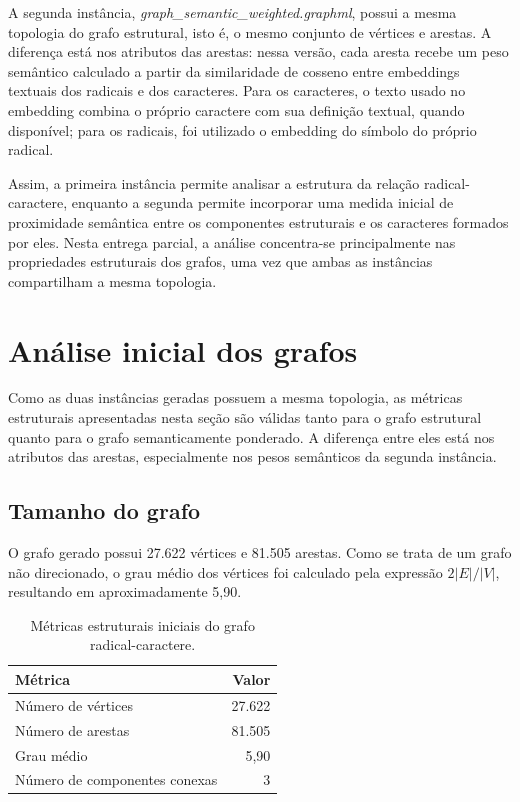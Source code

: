 \documentclass[10pt, a4paper]{extarticle}
\begin{document}
A segunda instância, \textit{graph\_semantic\_weighted.graphml}, possui a mesma topologia do grafo estrutural, isto é, o mesmo conjunto de vértices e arestas. A diferença está nos atributos das arestas: nessa versão, cada aresta recebe um peso semântico calculado a partir da similaridade de cosseno entre embeddings textuais dos radicais e dos caracteres. Para os caracteres, o texto usado no embedding combina o próprio caractere com sua definição textual, quando disponível; para os radicais, foi utilizado o embedding do símbolo do próprio radical.

Assim, a primeira instância permite analisar a estrutura da relação radical-caractere, enquanto a segunda permite incorporar uma medida inicial de proximidade semântica entre os componentes estruturais e os caracteres formados por eles. Nesta entrega parcial, a análise concentra-se principalmente nas propriedades estruturais dos grafos, uma vez que ambas as instâncias compartilham a mesma topologia.

\section{Análise inicial dos grafos}
Como as duas instâncias geradas possuem a mesma topologia, as métricas estruturais apresentadas nesta seção são válidas tanto para o grafo estrutural quanto para o grafo semanticamente ponderado. A diferença entre eles está nos atributos das arestas, especialmente nos pesos semânticos da segunda instância.

\subsection{Tamanho do grafo}
O grafo gerado possui 27.622 vértices e 81.505 arestas. Como se trata de um grafo não direcionado, o grau médio dos vértices foi calculado pela expressão \(2|E|/|V|\), resultando em aproximadamente 5,90.

\begin{table}[h]
\centering
\begin{tabular}{lr}
\hline
Métrica & Valor \\
\hline
Número de vértices & 27.622 \\
Número de arestas & 81.505 \\
Grau médio & 5,90 \\
Número de componentes conexas & 3 \\
\hline
\end{tabular}
\caption{Métricas estruturais iniciais do grafo radical-caractere.}
\end{table}
\end{document}
